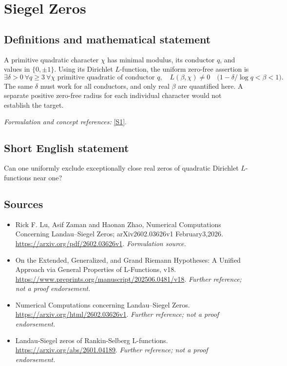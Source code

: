 \documentclass[11pt]{article}
\begin{document}
\section*{\texorpdfstring{Siegel Zeros}{Siegel Zeros}}\label{statement}
\subsection{Definitions and mathematical statement}
A primitive quadratic character $\chi$ has minimal modulus, its conductor $q$, and values in $\{0,\pm1\}$. Using its Dirichlet $L$-function, the uniform zero-free assertion is
\[
 \exists\delta>0\ \forall q\ge3\ \forall\chi\text{ primitive quadratic of conductor }q,
 \quad L(\beta,\chi)\ne0\quad\bigl(1-\delta/\log q<\beta<1\bigr).
\]
The same $\delta$ must work for all conductors, and only real $\beta$ are quantified here. A separate positive zero-free radius for each individual character would not establish the target.
\par\smallskip\textit{Formulation and concept references:} \href{https://arxiv.org/pdf/2602.03626v1}{[S1]}.

\subsection{Short English statement}
Can one uniformly exclude exceptionally close real zeros of quadratic Dirichlet $L$-functions near one?
\subsection{Sources}
\begin{itemize}
\item[S1]Rick F. Lu, Asif Zaman and Haonan Zhao, Numerical Computations Concerning Landau–Siegel Zeros; arXiv2602.03626v1 February3,2026.
\url{https://arxiv.org/pdf/2602.03626v1}.
\textit{Formulation source.}
\item[S2]On the Extended, Generalized, and Grand Riemann Hypotheses: A Unified Approach via General Properties of L-Functions, v18.
\url{https://www.preprints.org/manuscript/202506.0481/v18}.
\textit{Further reference; not a proof endorsement.}
\item[S3]Numerical Computations concerning Landau–Siegel Zeros.
\url{https://arxiv.org/html/2602.03626v1}.
\textit{Further reference; not a proof endorsement.}
\item[S4]Landau-Siegel zeros of Rankin-Selberg L-functions.
\url{https://arxiv.org/abs/2601.04189}.
\textit{Further reference; not a proof endorsement.}
\end{itemize}
\end{document}
